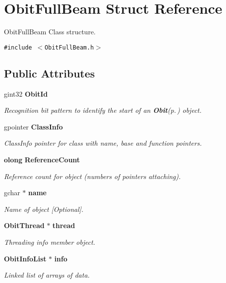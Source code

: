 \section{Obit\-Full\-Beam Struct Reference}
\label{structObitFullBeam}
Obit\-Full\-Beam Class structure.  


{\tt \#include $<$Obit\-Full\-Beam.h$>$}

\subsection*{Public Attributes}
\begin{CompactItemize}
\item 
gint32 {\bf Obit\-Id}
\begin{CompactList}\small\item\em Recognition bit pattern to identify the start of an {\bf Obit}{\rm (p.\,\pageref{structObit})} object. \item\end{CompactList}\item 
gpointer {\bf Class\-Info}
\begin{CompactList}\small\item\em Class\-Info pointer for class with name, base and function pointers. \item\end{CompactList}\item 
{\bf olong} {\bf Reference\-Count}
\begin{CompactList}\small\item\em Reference count for object (numbers of pointers attaching). \item\end{CompactList}\item 
gchar $\ast$ {\bf name}
\begin{CompactList}\small\item\em Name of object [Optional]. \item\end{CompactList}\item 
{\bf Obit\-Thread} $\ast$ {\bf thread}
\begin{CompactList}\small\item\em Threading info member object. \item\end{CompactList}\item 
{\bf Obit\-Info\-List} $\ast$ {\bf info}
\begin{CompactList}\small\item\em Linked list of arrays of data. \item\end{CompactList}\item 

\end{CompactItemize}
